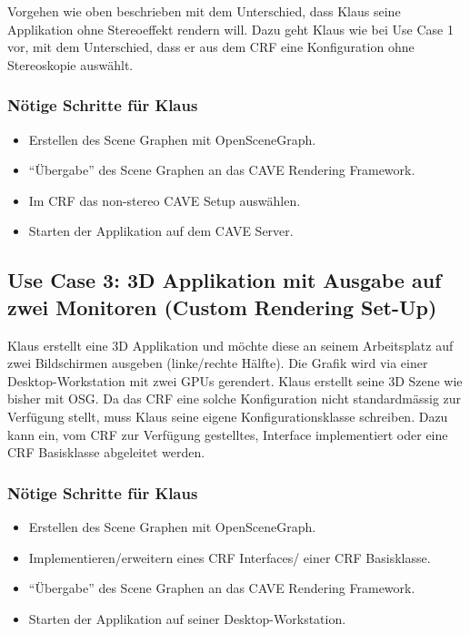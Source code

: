 Vorgehen wie oben beschrieben mit dem Unterschied, dass Klaus seine Applikation ohne Stereoeffekt rendern will. Dazu geht Klaus wie bei Use Case 1 vor, mit dem Unterschied, dass er aus dem CRF eine Konfiguration ohne Stereoskopie ausw\"ahlt.

\subsubsection{N\"otige Schritte f\"ur Klaus}

\begin{itemize}
	\item Erstellen des Scene Graphen mit OpenSceneGraph.
	\item "`\"Ubergabe"' des Scene Graphen an das CAVE Rendering Framework.
	\item Im CRF das non-stereo CAVE Setup ausw\"ahlen.
	\item Starten der Applikation auf dem CAVE Server.
\end{itemize}

\subsection{Use Case 3: 3D Applikation mit Ausgabe auf zwei Monitoren (Custom Rendering Set-Up)}

Klaus erstellt eine 3D Applikation und m\"ochte diese an seinem Arbeitsplatz auf zwei Bildschirmen ausgeben (linke/rechte H\"alfte). Die Grafik wird via einer Desktop-Workstation mit zwei GPUs gerendert. Klaus erstellt seine 3D Szene wie bisher mit OSG. Da das CRF eine solche Konfiguration nicht standardm\"assig zur Verf\"ugung stellt, muss Klaus seine eigene Konfigurationsklasse schreiben. Dazu kann ein, vom CRF zur Verf\"ugung gestelltes, Interface implementiert oder eine CRF Basisklasse abgeleitet werden.

\subsubsection{N\"otige Schritte f\"ur Klaus}

\begin{itemize}
	\item Erstellen des Scene Graphen mit OpenSceneGraph.
	\item Implementieren/erweitern eines CRF Interfaces/ einer CRF Basisklasse.
	\item "`\"Ubergabe"' des Scene Graphen an das CAVE Rendering Framework.
	\item Starten der Applikation auf seiner Desktop-Workstation.
\end{itemize}

